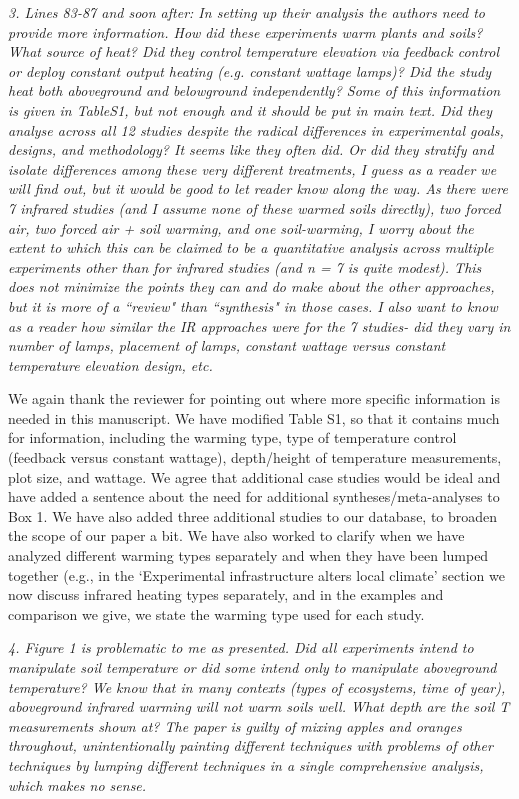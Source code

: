 \documentclass[11pt,a4paper]{letter}
\begin{document}
\par \emph{3. Lines 83-87 and soon after: In setting up their analysis the authors need to provide more information. How did these experiments warm plants and soils? What source of heat? Did they control temperature elevation via feedback control or deploy constant output heating (e.g. constant wattage lamps)? Did the study heat both aboveground and belowground independently? Some of this information is given in TableS1, but not enough and it should be put in main text. Did they analyse across all 12 studies despite the radical differences in experimental goals, designs, and methodology? It seems like they often did. Or did they stratify and isolate differences among these very different treatments, I guess as a reader we will find out, but it would be good to let reader know along the way. As there were 7 infrared studies (and I assume none of these warmed soils directly), two forced air, two forced air + soil warming, and one soil-warming, I worry about the extent to which this can be claimed to be a quantitative analysis across multiple experiments other than for infrared
studies (and n = 7 is quite modest). This does not minimize the points they can and do make about the other approaches, but it is more of a ``review" than ``synthesis" in those cases. I also want to know as a reader how similar the IR approaches were for the 7 studies- did they vary in number of lamps, placement of lamps, constant wattage versus constant temperature elevation design, etc.}
\par We again thank the reviewer for pointing out where more specific information is needed in this manuscript. We have modified Table S1, so that it contains much for information, including the warming type, type of temperature control (feedback versus constant wattage), depth/height of temperature measurements, plot size, and wattage. We agree that additional case studies would be ideal and have added a sentence about the need for additional syntheses/meta-analyses to Box 1. We have also added three additional studies to our database, to broaden the scope of our paper a bit.  We have also worked to clarify when we have analyzed different warming types separately and when they have been lumped together (e.g., in the `Experimental infrastructure alters local climate' section we now discuss infrared heating types separately, and in the examples and comparison we give, we state the warming type used for each study. 
\\
\par \emph{4. Figure 1 is problematic to me as presented. Did all experiments intend to manipulate soil temperature or did some intend only to manipulate aboveground temperature? We know that in many contexts (types of ecosystems, time of year), aboveground infrared warming will not warm soils well. What depth are the soil T measurements shown at? The paper is guilty of mixing apples and oranges throughout, unintentionally painting different techniques with problems of other techniques by lumping different techniques in a single comprehensive analysis, which makes no sense.}
\end{document}
